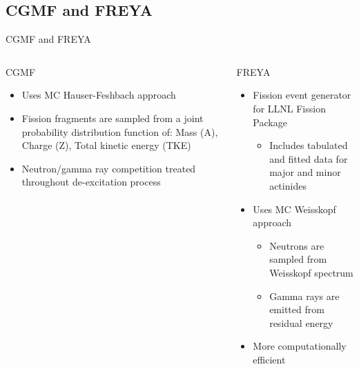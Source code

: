 \documentclass{beamer}
\begin{document}
\subsection{CGMF and FREYA}
\begin{frame}{CGMF and FREYA}
\begin{columns}
  \begin{column}{0.5\textwidth}
    \begin{block}{CGMF}
    \begin{itemize}
    \item Uses MC Hauser-Feshbach approach
    \item Fission fragments are sampled from a joint probability distribution function of: Mass (A), Charge (Z), Total kinetic energy (TKE)
    \item Neutron/gamma ray competition treated throughout de-excitation process
    \end{itemize}
	\end{block}
  \end{column}
  \begin{column}{0.5\textwidth}
  \vspace*{-0.2cm}
    \begin{block}{FREYA}
    \begin{itemize}
    \item Fission event generator for LLNL Fission Package
      \begin{itemize}
      \item Includes tabulated and fitted data for major and minor actinides
      \end{itemize}
    \item Uses MC Weisskopf approach
    \begin{itemize}
    \item Neutrons are sampled from Weisskopf spectrum
    \item Gamma rays are emitted from residual energy
    \end{itemize}
    \item More computationally efficient
    \end{itemize}
	\end{block}
  \end{column}
\end{columns}
\end{frame}
\end{document}
